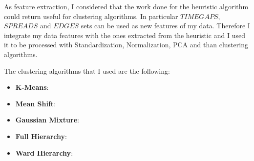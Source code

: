 As feature extraction, I considered that the work done for the heuristic algorithm could return useful for clustering algorithms. In particular $TIMEGAPS$, $SPREADS$ and $EDGES$ sets can be used as new features of my data. Therefore I integrate my data features with the ones extracted from the heuristic and I used it to be processed with Standardization, Normalization, PCA and than clustering algorithms.

The clustering algorithms that I used are the following: 
\begin{itemize}
	\item \textbf{K-Means}:
	\item \textbf{Mean Shift}:
	\item \textbf{Gaussian Mixture}:
	\item \textbf{Full Hierarchy}:
	\item \textbf{Ward Hierarchy}: 
\end{itemize}